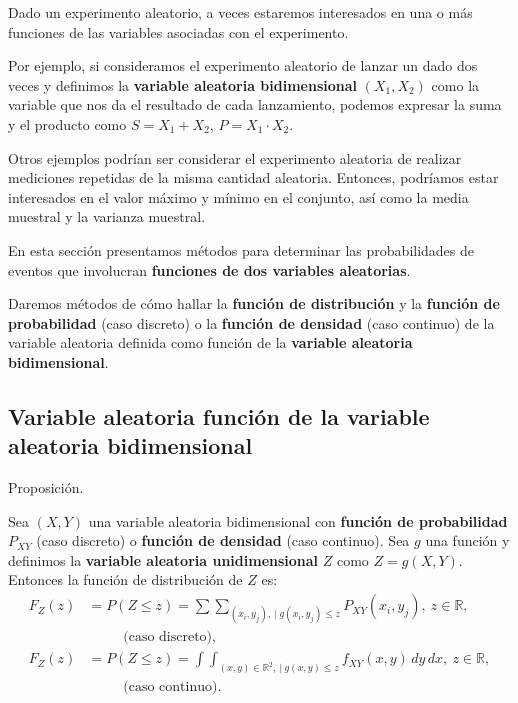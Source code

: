 \documentclass[
  letterpaper,
  DIV=11,
  numbers=noendperiod]{scrreprt}
\begin{document}
Dado un experimento aleatorio, a veces estaremos interesados en una o
más funciones de las variables asociadas con el experimento.

Por ejemplo, si consideramos el experimento aleatorio de lanzar un dado
dos veces y definimos la \textbf{variable aleatoria bidimensional}
\((X_1,X_2)\) como la variable que nos da el resultado de cada
lanzamiento, podemos expresar la suma y el producto como \(S=X_1+X_2\),
\(P=X_1\cdot X_2\).

Otros ejemplos podrían ser considerar el experimento aleatoria de
realizar mediciones repetidas de la misma cantidad aleatoria. Entonces,
podríamos estar interesados en el valor máximo y mínimo en el conjunto,
así como la media muestral y la varianza muestral.

En esta sección presentamos métodos para determinar las probabilidades
de eventos que involucran \textbf{funciones de dos variables
aleatorias}.

Daremos métodos de cómo hallar la \textbf{función de distribución} y la
\textbf{función de probabilidad} (caso discreto) o la \textbf{función de
densidad} (caso continuo) de la variable aleatoria definida como función
de la \textbf{variable aleatoria bidimensional}.

\hypertarget{variable-aleatoria-funciuxf3n-de-la-variable-aleatoria-bidimensional}{%
\subsection{Variable aleatoria función de la variable aleatoria
bidimensional}\label{variable-aleatoria-funciuxf3n-de-la-variable-aleatoria-bidimensional}}

Proposición.

Sea \((X,Y)\) una variable aleatoria bidimensional con \textbf{función
de probabilidad} \(P_{XY}\) (caso discreto) o \textbf{función de
densidad} (caso continuo). Sea \(g\) una función y definimos la
\textbf{variable aleatoria unidimensional} \(Z\) como \(Z=g(X,Y)\).
Entonces la función de distribución de \(Z\) es: \[
\begin{array}{rl}
F_Z(z) & = \displaystyle P(Z\leq z)=\sum\sum_{(x_i,y_j),\ |\ g(x_i,y_j)\leq z} P_{XY}(x_i,y_j),\ z\in\mathbb{R},\\ &\ \qquad\mbox{ (caso discreto),}\\
F_Z(z) & = \displaystyle  P(Z\leq z)=\int\int_{(x,y)\in\mathbb{R}^2,\ |\ g(x,y)\leq z} f_{XY}(x,y)\,dy\, dx, \ z\in\mathbb{R},\\ &\ \qquad\mbox{ (caso continuo).}
\end{array}
\]
\end{document}
